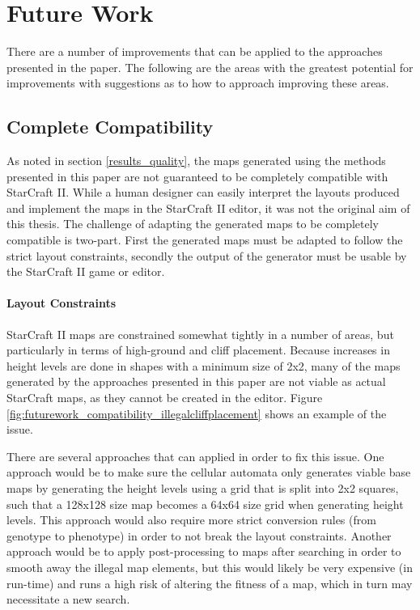 \chapter{Future Work}
\label{futurework}
There are a number of improvements that can be applied to the approaches presented in the paper. The following are the areas with the greatest potential for improvements with suggestions as to how to approach improving these areas.
\section{Complete Compatibility}
\label{futurework_compatibility}
As noted in section \ref{results_quality}, the maps generated using the methods presented in this paper are not guaranteed to be completely compatible with StarCraft II. While a human designer can easily interpret the layouts produced and implement the maps in the StarCraft II editor, it was not the original aim of this thesis. The challenge of adapting the generated maps to be completely compatible is two-part. First the generated maps must be adapted to follow the strict layout constraints, secondly the output of the generator must be usable by the StarCraft II game or editor. 

\subsubsection{Layout Constraints}
StarCraft II maps are constrained somewhat tightly in a number of areas, but particularly in terms of high-ground and cliff placement. Because increases in height levels are done in shapes with a minimum size of 2x2, many of the maps generated by the approaches presented in this paper are not viable as actual StarCraft maps, as they cannot be created in the editor. Figure \ref{fig:futurework_compatibility_illegalcliffplacement} shows an example of the issue.


There are several approaches that can applied in order to fix this issue. One approach would be to make sure the cellular automata only generates viable base maps by generating the height levels using a grid that is split into 2x2 squares, such that a 128x128 size map becomes a 64x64 size grid when generating height levels. This approach would also require more strict conversion rules (from genotype to phenotype) in order to not break the layout constraints. Another approach would be to apply post-processing to maps after searching in order to smooth away the illegal map elements, but this would likely be very expensive (in run-time) and runs a high risk of altering the fitness of a map, which in turn may necessitate a new search. 

